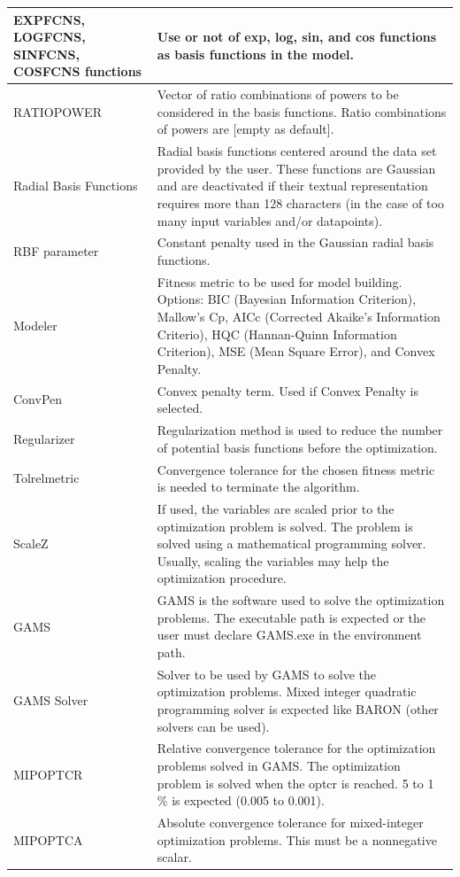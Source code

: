 \begin{center}
\begin{longtable}{|p{}|p{} |}
			\raggedright{EXPFCNS, LOGFCNS, SINFCNS, COSFCNS functions}& Use or not of exp, log, sin, and cos functions as basis functions in the model. \\ \hline
			RATIOPOWER& Vector of ratio combinations of powers to be considered in the basis functions. Ratio combinations of powers are [empty as default].\\ \hline
			Radial Basis Functions& Radial basis functions centered around the data set provided by the user. These functions are Gaussian and are deactivated if their textual representation requires more than 128 characters (in the case of too many input variables and/or datapoints). \\ \hline
			RBF parameter&Constant penalty used in the Gaussian radial basis functions.  \\ \hline
			Modeler & Fitness metric to be used for model building. Options: BIC (Bayesian Information Criterion), Mallow's Cp, AICc (Corrected Akaike's Information Criterio), HQC (Hannan-Quinn Information Criterion), MSE (Mean Square Error), and Convex Penalty. \\ \hline
			ConvPen& Convex penalty term. Used if Convex Penalty is selected. \\ \hline
			Regularizer & Regularization method is used to reduce the number of potential basis functions before the optimization.\\ \hline 
			Tolrelmetric & Convergence tolerance for the chosen fitness metric is needed to terminate the algorithm. \\ \hline
			ScaleZ&If used, the variables are scaled prior to the optimization problem is solved. The problem is solved using a mathematical programming solver. Usually, scaling the variables may help the optimization procedure.\\ \hline
			GAMS&GAMS is the software used to solve the optimization problems. The executable path is expected or the user must declare GAMS.exe in the environment path.\\ \hline
			GAMS Solver&Solver to be used by GAMS to solve the optimization problems. Mixed integer quadratic programming solver is expected like BARON (other solvers can be used).\\ \hline
			MIPOPTCR & Relative convergence tolerance for the optimization problems solved in GAMS. The optimization problem is solved when the optcr is reached. 5 to 1 \% is expected (0.005 to 0.001).\\ \hline
			MIPOPTCA & Absolute convergence tolerance for mixed-integer optimization problems. This must be a nonnegative scalar. \\ \hline

\end{longtable}
\end{center}
